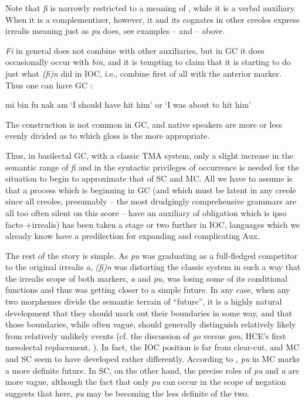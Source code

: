 
Note that \textit{fi} is narrowly restricted to a meaning of , while it is a verbal auxiliary. When it is a complementizer, however, it and its cognates in other creoles express irrealis meaning just as \textit{pu} does, see examples -- and -- above.

\textit{Fi} in general does not combine with other auxiliaries, but in GC it does occasionally occur with \textit{bin}, and it is tempting to claim that it is starting to do just what \textit{(fi)n} did in IOC, i.e., combine first of all with the anterior marker. Thus one can have GC :

\ea\label{ex:2:121}
mi bin fu nak am
\glt `I should have hit him' or `I was about to hit him'
\z

The construction is not common in GC, and native speakers are more or less evenly divided as to which gloss is the more appropriate.

Thus, in basilectal GC, with a classic TMA system, only a slight increase in the semantic range of \textit{fi} and in the syntactic privileges of occurrence is needed for the situation to begin to approximate that of SC and MC. All we have to assume is that a process which is beginning in GC (and which must be latent in any creole since all creoles, presumably -- the most drudgingly comprehensive grammars are all too often silent on this score -- have an auxiliary of obligation which is ipso facto +irrealis) has been taken a stage or two further in IOC, languages which we already know have a predilection for expanding and complicating Aux.

The rest of the story is simple. As \textit{pu} was graduating as a full-fledged competitor to the original irrealis \textit{a}, \textit{(fi)n} was distorting the classic system in such a way that the irrealis scope of both markers, \textit{a} and \textit{pu}, was losing some of its conditional functions and thus was getting closer to a simple future. In any case, when any two mor\-phemes divide the semantic terrain of ``future'', it is a highly natural development that they should mark out their boundaries in some way, and that those boundaries, while often vague, should generally dis\-tinguish relatively likely from relatively unlikely events (cf. the discus\-sion of \textit{go} versus \textit{gon}, HCE's first mesolectal replacement, \citealt[23ff., 181ff.]{Bickerton1977}).
In fact, the IOC position is far from clear-cut, and MC and SC seem to have developed rather differently. According to \citet{Corne1977}, \textit{pu} in MC marks a more definite future. In SC, on the other hand, the precise roles of \textit{pu} and \textit{a} are more vague, although the fact that only \textit{pu} can occur in the scope of negation suggests that here, \textit{pu} may be becoming the less definite of the two.\\\\

